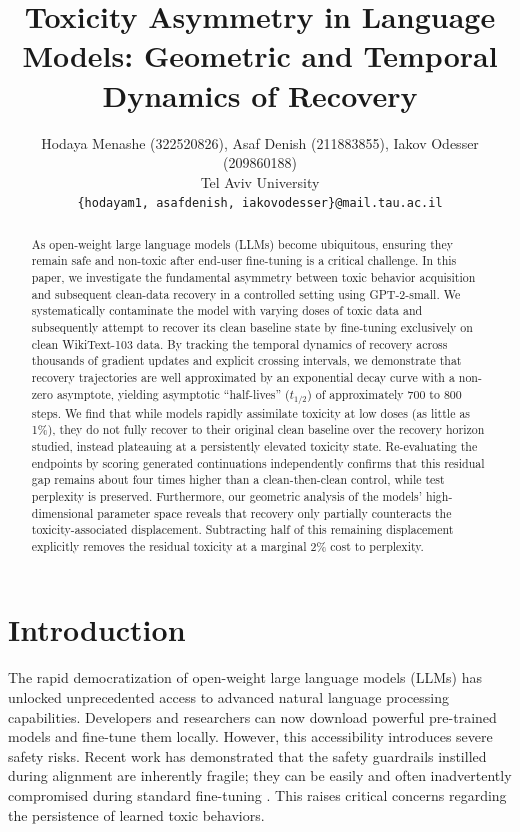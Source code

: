 \documentclass[11pt,a4paper]{article}
\title{Toxicity Asymmetry in Language Models: Geometric and Temporal Dynamics of Recovery}
\author{Hodaya Menashe (322520826), Asaf Denish (211883855), Iakov Odesser (209860188) \\
Tel Aviv University \\
\texttt{\{hodayam1, asafdenish, iakovodesser\}@mail.tau.ac.il}}
\begin{document}
\maketitle

\begin{abstract}
As open-weight large language models (LLMs) become ubiquitous, ensuring they remain safe and non-toxic after end-user fine-tuning is a critical challenge. In this paper, we investigate the fundamental asymmetry between toxic behavior acquisition and subsequent clean-data recovery in a controlled setting using GPT-2-small. We systematically contaminate the model with varying doses of toxic data and subsequently attempt to recover its clean baseline state by fine-tuning exclusively on clean WikiText-103 data. By tracking the temporal dynamics of recovery across thousands of gradient updates and explicit crossing intervals, we demonstrate that recovery trajectories are well approximated by an exponential decay curve with a non-zero asymptote, yielding asymptotic ``half-lives'' ($t_{1/2}$) of approximately 700 to 800 steps. We find that while models rapidly assimilate toxicity at low doses (as little as 1\%), they do not fully recover to their original clean baseline over the recovery horizon studied, instead plateauing at a persistently elevated toxicity state. Re-evaluating the endpoints by scoring generated continuations independently confirms that this residual gap remains about four times higher than a clean-then-clean control, while test perplexity is preserved. Furthermore, our geometric analysis of the models' high-dimensional parameter space reveals that recovery only partially counteracts the toxicity-associated displacement. Subtracting half of this remaining displacement explicitly removes the residual toxicity at a marginal 2\% cost to perplexity.
\end{abstract}

\section{Introduction}
The rapid democratization of open-weight large language models (LLMs) has unlocked unprecedented access to advanced natural language processing capabilities. Developers and researchers can now download powerful pre-trained models and fine-tune them locally. However, this accessibility introduces severe safety risks. Recent work has demonstrated that the safety guardrails instilled during alignment are inherently fragile; they can be easily and often inadvertently compromised during standard fine-tuning \citep{qi2023fine}. This raises critical concerns regarding the persistence of learned toxic behaviors.
\end{document}
